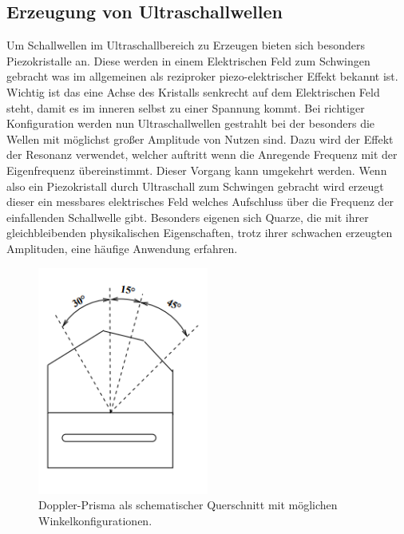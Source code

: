 \subsection{Erzeugung von Ultraschallwellen}
Um Schallwellen im Ultraschallbereich zu Erzeugen bieten sich besonders Piezokristalle an. Diese werden in einem Elektrischen Feld 
zum Schwingen gebracht was im allgemeinen als reziproker piezo-elektrischer Effekt bekannt ist. Wichtig ist das eine Achse des Kristalls
senkrecht auf dem Elektrischen Feld steht, damit es im inneren selbst zu einer Spannung kommt. Bei richtiger Konfiguration werden nun 
Ultraschallwellen gestrahlt bei der besonders die Wellen mit möglichst großer Amplitude von Nutzen sind. 
Dazu wird der Effekt der Resonanz verwendet, welcher auftritt wenn die Anregende Frequenz mit der Eigenfrequenz übereinstimmt.
Dieser Vorgang kann umgekehrt werden. Wenn also ein Piezokristall durch Ultraschall zum Schwingen gebracht wird erzeugt dieser ein messbares
elektrisches Feld welches Aufschluss über die Frequenz der einfallenden Schallwelle gibt. 
Besonders eigenen sich Quarze, die mit ihrer gleichbleibenden physikalischen Eigenschaften, trotz ihrer schwachen erzeugten Amplituden,
eine häufige Anwendung erfahren. 

\begin{figure}
    \centering
    \includegraphics[width=0.5\textwidth]{bilder/winkel2.png}
    \caption{Doppler-Prisma als schematischer Querschnitt mit möglichen Winkelkonfigurationen. \cite{skript}} 
    \label{fig:figskizze1}
\end{figure}